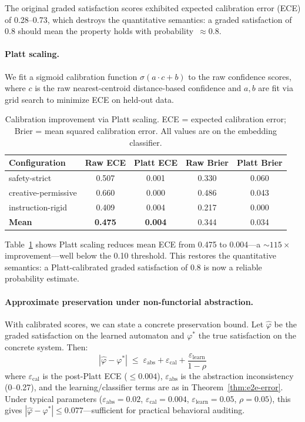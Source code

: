 \documentclass[11pt]{article}
\begin{document}
The original graded satisfaction scores exhibited expected calibration
error (ECE) of 0.28--0.73, which destroys the quantitative semantics:
a graded satisfaction of 0.8 should mean the property holds with
probability~$\approx$0.8.

\paragraph{Platt scaling.}
We fit a sigmoid calibration function $\sigma(a \cdot c + b)$
to the raw confidence scores, where $c$ is the raw nearest-centroid
distance-based confidence and $a, b$ are fit via grid search to
minimize ECE on held-out data.

\begin{table}[t]
\centering
\caption{Calibration improvement via Platt scaling.
  ECE = expected calibration error; Brier = mean squared calibration
  error.  All values are on the embedding classifier.}
\label{tab:calibration}
\small
\begin{tabular}{@{}lcccc@{}}
\toprule
\textbf{Configuration} & \textbf{Raw ECE} & \textbf{Platt ECE}
  & \textbf{Raw Brier} & \textbf{Platt Brier} \\
\midrule
safety-strict          & 0.507 & 0.001 & 0.330 & 0.060 \\
creative-permissive    & 0.660 & 0.000 & 0.486 & 0.043 \\
instruction-rigid      & 0.409 & 0.004 & 0.217 & 0.000 \\
\midrule
\textbf{Mean}          & \textbf{0.475} & \textbf{0.004} & 0.344 & 0.034 \\
\bottomrule
\end{tabular}
\end{table}

Table~\ref{tab:calibration} shows Platt scaling reduces mean ECE from
0.475 to 0.004---a ${\sim}115{\times}$ improvement---well below the
0.10 threshold.  This restores the quantitative semantics: a
Platt-calibrated graded satisfaction of 0.8 is now a reliable
probability estimate.

\paragraph{Approximate preservation under non-functorial abstraction.}
With calibrated scores, we can state a concrete preservation bound.
Let $\hat{\varphi}$ be the graded satisfaction on the learned
automaton and $\varphi^*$ the true satisfaction on the concrete
system.  Then:
\begin{equation}\label{eq:approx-preservation}
  |\hat{\varphi} - \varphi^*| \;\le\;
  \varepsilon_{\mathrm{abs}} + \varepsilon_{\mathrm{cal}}
  + \frac{\varepsilon_{\mathrm{learn}}}{1 - \rho}
\end{equation}
where $\varepsilon_{\mathrm{cal}}$ is the post-Platt ECE (${\le}0.004$),
$\varepsilon_{\mathrm{abs}}$ is the abstraction inconsistency
(0--0.27), and the learning/classifier terms are as in
Theorem~\ref{thm:e2e-error}.  Under typical parameters
($\varepsilon_{\mathrm{abs}}{=}0.02$, $\varepsilon_{\mathrm{cal}}{=}0.004$,
$\varepsilon_{\mathrm{learn}}{=}0.05$, $\rho{=}0.05$), this gives
$|\hat{\varphi} - \varphi^*| \le 0.077$---sufficient for practical
behavioral auditing.
\end{document}
